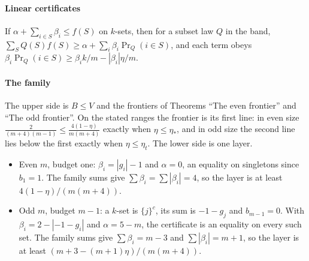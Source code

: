 \paragraph{Linear certificates} If $\alpha+\sum_{i\in S}\beta_i\le f(S)$ on $k$-sets, then for a
subset law $Q$ in the band,
$\sum_SQ(S)f(S)\ge\alpha+\sum_i\beta_i\Pr_Q(i\in S)$, and each term obeys
$\beta_i\Pr_Q(i\in S)\ge\beta_ik/m-|\beta_i|\eta/m$.

\paragraph{The family} The upper side is $B\le V$ and the frontiers of Theorems ``The even
frontier'' and ``The odd frontier''. On the stated ranges the frontier is its first line: in even
size $\frac{2}{(m+4)(m-1)}\le\frac{4(1-\eta)}{m(m+4)}$ exactly when $\eta\le\eta_*$, and in odd size
the second line lies below the first exactly when $\eta\le\eta_t$. The lower side is one layer.
\begin{itemize}
\item Even $m$, budget one: $\beta_i=|g_i|-1$ and $\alpha=0$, an equality on singletons since
$b_1=1$. The family sums give $\sum\beta_i=\sum|\beta_i|=4$, so the layer is at least
$4(1-\eta)/(m(m+4))$.
\item Odd $m$, budget $m-1$: a $k$-set is $\{j\}^{c}$, its sum is $-1-g_j$ and $b_{m-1}=0$. With
$\beta_i=2-|-1-g_i|$ and $\alpha=5-m$, the certificate is an equality on every such set. The family
sums give $\sum\beta_i=m-3$ and $\sum|\beta_i|=m+1$, so the layer is at least
$(m+3-(m+1)\eta)/(m(m+4))$.
\end{itemize}

